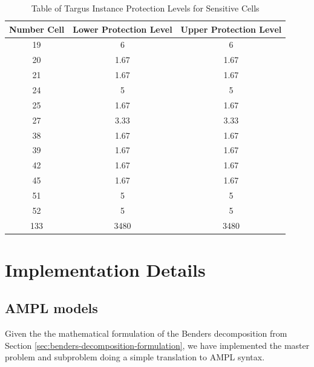 \documentclass[11pt,a4paper]{article}
\begin{document}
\begin{table}[H]
    \centering
    \begin{tabular}{c | c | c}
        \textbf{Number Cell} & \textbf{Lower Protection Level} & \textbf{Upper Protection Level} \\
        \toprule
       19	& 6   & 6 \\
       20	& 1.67 & 1.67 \\
       21	& 1.67 & 1.67 \\
       24	& 5   & 5 \\
       25	& 1.67 & 1.67 \\
       27	& 3.33 & 3.33 \\
       38	& 1.67 & 1.67 \\
       39	& 1.67 & 1.67 \\
       42	& 1.67 & 1.67 \\
       45	& 1.67 & 1.67 \\
       51	& 5   & 5 \\
       52	& 5   & 5 \\
       133	& 3480 & 3480
    \end{tabular}
    \caption{Table of Targus Instance Protection Levels for Sensitive Cells}
    \label{tab:targus-protection-levels}
\end{table}



\section{Implementation Details}

\subsection{AMPL models}
Given the the mathematical formulation of the Benders decomposition from Section \ref{sec:benders-decomposition-formulation}, we have implemented the master problem and subproblem doing a simple translation to AMPL syntax.
\end{document}
